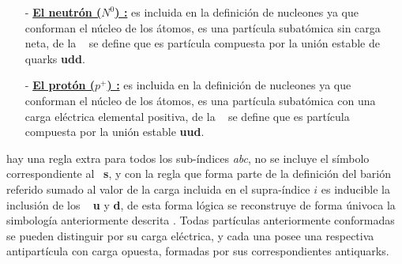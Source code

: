 \begin{itemize}
\item[-] \href{https://es.wikipedia.org/wiki/Bari\%C3\%B3n_omega}{\textbf{El neutrón ($N^0$) :}} es incluida en la definición de nucleones ya que conforman el núcleo de los átomos, es una partícula subatómica sin carga neta,  de la \QCD ~ se define que es partícula compuesta por la unión estable de quarks \textbf{udd}.

\item[-] \href{https://es.wikipedia.org/wiki/Prot\%C3\%B3n}{\textbf{El protón ($p^+$) :}} es incluida en la definición de nucleones ya que conforman el núcleo de los átomos, es una partícula subatómica con una carga eléctrica elemental positiva, de la \QCD ~ se define que es partícula compuesta por la unión estable \textbf{uud}.

\end{itemize}
hay una regla extra para todos los sub-índices \textit{abc}, no se incluye el símbolo correspondiente al \quark ~\textbf{s}, y con la regla que forma parte de la definición del barión referido sumado al valor de la carga incluida en el supra-índice $i$ es inducible la inclusión de los \quarks ~ \textbf{u} y \textbf{d}, de esta forma lógica se reconstruye de forma únivoca la simbología anteriormente descrita %
. Todas partículas anteriormente conformadas se pueden distinguir por su carga eléctrica, y cada una posee una respectiva antipartícula con carga opuesta, formadas por sus correspondientes antiquarks.

